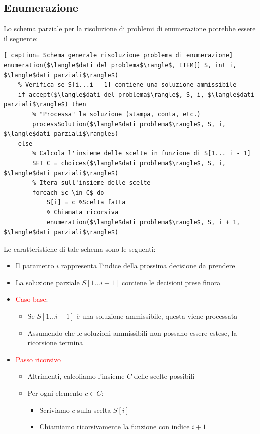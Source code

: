 \documentclass[../cheatSheetAlgoritmi.tex]{subfiles}
\begin{document}
\subsection{Enumerazione}
Lo schema parziale per la risoluzione di problemi di enumerazione potrebbe essere il seguente: 
 \begin{lstlisting}[ caption= Schema generale risoluzione problema di enumerazione]
enumeration($\langle$dati del problema$\rangle$, ITEM[] S, int i, $\langle$dati parziali$\rangle$)
	% Verifica se S[i...i - 1] contiene una soluzione ammissibile
	if accept($\langle$dati del problema$\rangle$, S, i, $\langle$dati parziali$\rangle$) then
		% "Processa" la soluzione (stampa, conta, etc.)
		processSolution($\langle$dati problema$\rangle$, S, i, $\langle$dati parziali$\rangle$)
	else
		% Calcola l'insieme delle scelte in funzione di S[1... i - 1]
		SET C = choices($\langle$dati problema$\rangle$, S, i, $\langle$dati parziali$\rangle$)
		% Itera sull'insieme delle scelte
		foreach $c \in C$ do
			S[i] = c %Scelta fatta
			% Chiamata ricorsiva
			enumeration($\langle$dati problema$\rangle$, S, i + 1, $\langle$dati parziali$\rangle$)
\end{lstlisting}
Le caratteristiche di tale schema sono le seguenti: 
\begin{itemize}
	\item Il parametro $i$ rappresenta l'indice della prossima decisione da prendere
	\item La soluzione parziale $S[1...i - 1]$ contiene le decisioni prese finora
	\item \textcolor{red}{Caso base}:
	\begin{itemize}
		\item Se $S[1... i - 1]$ è una soluzione ammissibile, questa viene processata
		\item Assumendo che le soluzioni ammissibili non possano essere estese, la ricorsione termina
	\end{itemize}
	\item \textcolor{red}{Passo ricorsivo}
	\begin{itemize}
		\item Altrimenti, calcoliamo l'insieme $C$ delle scelte possibili
		\item Per ogni elemento $c \in C$:
		\begin{itemize}
			\item Scriviamo $c$ sulla scelta $S[i]$
			\item Chiamiamo ricorsivamente la funzione con indice $i+ 1$
		\end{itemize}
	\end{itemize}
\end{itemize}
\end{document}
